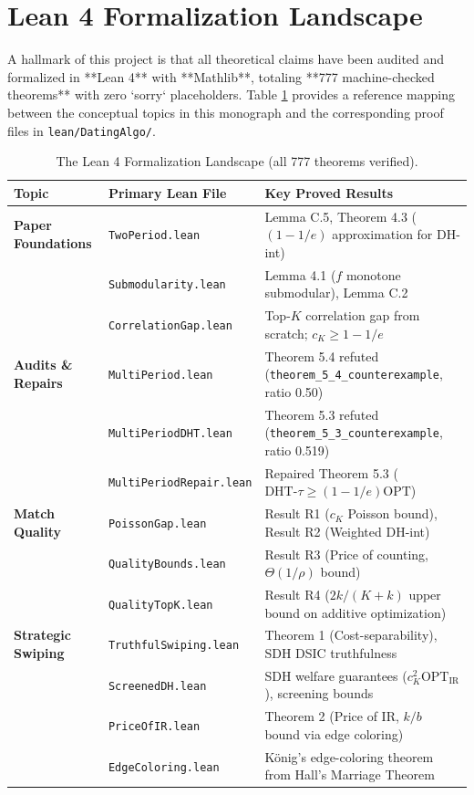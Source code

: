 \documentclass[11pt,letterpaper]{article}
\theoremstyle{definition}
\theoremstyle{plain}
\theoremstyle{remark}
\begin{document}
\newpage
\section{Lean 4 Formalization Landscape}
\label{sec:lean_landscape}

A hallmark of this project is that all theoretical claims have been audited and formalized in **Lean 4** with **Mathlib**, totaling **777 machine-checked theorems** with zero `sorry` placeholders. Table \ref{tab:lean_files} provides a reference mapping between the conceptual topics in this monograph and the corresponding proof files in \texttt{lean/DatingAlgo/}.

\begin{table}[ht]
\centering
\small
\begin{tabular}{@{}llp{8.5cm}@{}}
\toprule
Topic & Primary Lean File & Key Proved Results \\
\midrule
\textbf{Paper Foundations} & \texttt{TwoPeriod.lean} & Lemma C.5, Theorem 4.3 ($(1-1/e)$ approximation for DH-int) \\
& \texttt{Submodularity.lean} & Lemma 4.1 ($f$ monotone submodular), Lemma C.2 \\
& \texttt{CorrelationGap.lean} & Top-$K$ correlation gap from scratch; $c_K \ge 1-1/e$ \\
\midrule
\textbf{Audits \& Repairs} & \texttt{MultiPeriod.lean} & Theorem 5.4 refuted (\texttt{theorem\_5\_4\_counterexample}, ratio 0.50) \\
& \texttt{MultiPeriodDHT.lean} & Theorem 5.3 refuted (\texttt{theorem\_5\_3\_counterexample}, ratio 0.519) \\
& \texttt{MultiPeriodRepair.lean} & Repaired Theorem 5.3 ($\text{DHT-}\tau \ge (1-1/e) \mathrm{OPT}$) \\
\midrule
\textbf{Match Quality} & \texttt{PoissonGap.lean} & Result R1 ($c_K$ Poisson bound), Result R2 (Weighted DH-int) \\
& \texttt{QualityBounds.lean} & Result R3 (Price of counting, $\Theta(1/\rho)$ bound) \\
& \texttt{QualityTopK.lean} & Result R4 ($2k/(K+k)$ upper bound on additive optimization) \\
\midrule
\textbf{Strategic Swiping} & \texttt{TruthfulSwiping.lean} & Theorem 1 (Cost-separability), SDH DSIC truthfulness \\
& \texttt{ScreenedDH.lean} & SDH welfare guarantees ($c_K^2 \mathrm{OPT_{IR}}$), screening bounds \\
& \texttt{PriceOfIR.lean} & Theorem 2 (Price of IR, $k/b$ bound via edge coloring) \\
& \texttt{EdgeColoring.lean} & König's edge-coloring theorem from Hall's Marriage Theorem \\
\bottomrule
\end{tabular}
\caption{The Lean 4 Formalization Landscape (all 777 theorems verified).}
\label{tab:lean_files}
\end{table}
\end{document}
